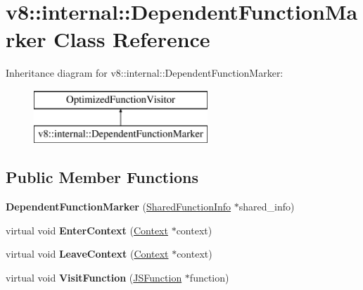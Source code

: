 \hypertarget{classv8_1_1internal_1_1_dependent_function_marker}{}\section{v8\+:\+:internal\+:\+:Dependent\+Function\+Marker Class Reference}
\label{classv8_1_1internal_1_1_dependent_function_marker}
Inheritance diagram for v8\+:\+:internal\+:\+:Dependent\+Function\+Marker\+:\begin{figure}[H]
\begin{center}
\leavevmode
\includegraphics[height=2.000000cm]{classv8_1_1internal_1_1_dependent_function_marker}
\end{center}
\end{figure}
\subsection*{Public Member Functions}
\begin{DoxyCompactItemize}
\item 
{\bfseries Dependent\+Function\+Marker} (\hyperlink{classv8_1_1internal_1_1_shared_function_info}{Shared\+Function\+Info} $\ast$shared\+\_\+info)\hypertarget{classv8_1_1internal_1_1_dependent_function_marker_ad359f825843bdf536d88a0ceec4d645a}{}\label{classv8_1_1internal_1_1_dependent_function_marker_ad359f825843bdf536d88a0ceec4d645a}

\item 
virtual void {\bfseries Enter\+Context} (\hyperlink{classv8_1_1internal_1_1_context}{Context} $\ast$context)\hypertarget{classv8_1_1internal_1_1_dependent_function_marker_af9e56f6a2bb6003e950f3e9293a72731}{}\label{classv8_1_1internal_1_1_dependent_function_marker_af9e56f6a2bb6003e950f3e9293a72731}

\item 
virtual void {\bfseries Leave\+Context} (\hyperlink{classv8_1_1internal_1_1_context}{Context} $\ast$context)\hypertarget{classv8_1_1internal_1_1_dependent_function_marker_aca050ad932c28e1955c47a27557a6ddf}{}\label{classv8_1_1internal_1_1_dependent_function_marker_aca050ad932c28e1955c47a27557a6ddf}

\item 
virtual void {\bfseries Visit\+Function} (\hyperlink{classv8_1_1internal_1_1_j_s_function}{J\+S\+Function} $\ast$function)\hypertarget{classv8_1_1internal_1_1_dependent_function_marker_a51887c50f4dff6af26d014570a8fa90f}{}\label{classv8_1_1internal_1_1_dependent_function_marker_a51887c50f4dff6af26d014570a8fa90f}

\end{DoxyCompactItemize}
